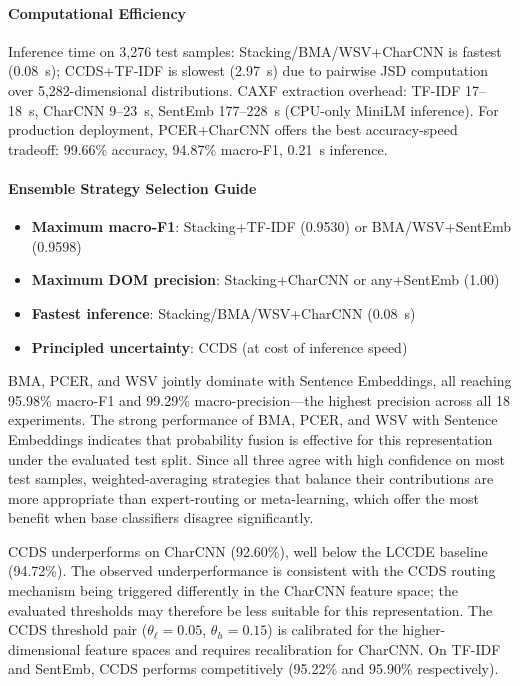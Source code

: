\documentclass[11pt,a4paper]{article}
\begin{document}
\paragraph{Computational Efficiency}
Inference time on 3,276 test samples: Stacking/BMA/WSV+CharCNN is fastest
(0.08~s); CCDS+TF-IDF is slowest (2.97~s) due to pairwise JSD computation
over 5,282-dimensional distributions. CAXF extraction overhead: TF-IDF
17--18~s, CharCNN 9--23~s, SentEmb 177--228~s (CPU-only MiniLM inference).
For production deployment, PCER+CharCNN offers the best accuracy-speed
tradeoff: 99.66\% accuracy, 94.87\% macro-F1, 0.21~s inference.

\paragraph{Ensemble Strategy Selection Guide}
\begin{itemize}
  \item \textbf{Maximum macro-F1}: Stacking+TF-IDF (0.9530) or BMA/WSV+SentEmb (0.9598)
  \item \textbf{Maximum DOM precision}: Stacking+CharCNN or any+SentEmb (1.00)
  \item \textbf{Fastest inference}: Stacking/BMA/WSV+CharCNN (0.08~s)
  \item \textbf{Principled uncertainty}: CCDS (at cost of inference speed)
\end{itemize}

BMA, PCER, and WSV jointly dominate with Sentence Embeddings, all reaching 95.98\% macro-F1 and
99.29\% macro-precision---the highest precision across all 18 experiments. The strong performance of BMA, PCER, and WSV with Sentence Embeddings indicates that probability fusion is effective for this representation under the evaluated test split.
Since all three agree with high confidence on most test samples, weighted-averaging strategies that balance their
contributions are more appropriate than expert-routing or meta-learning, which offer the most
benefit when base classifiers disagree significantly.

CCDS underperforms on CharCNN (92.60\%), well below the LCCDE baseline (94.72\%). The observed underperformance is consistent with the CCDS routing mechanism being triggered differently in the CharCNN feature space; 
the evaluated thresholds may therefore be less suitable for this representation.
The CCDS threshold pair ($\theta_\ell=0.05$, $\theta_h=0.15$) is calibrated for the
higher-dimensional feature spaces and requires recalibration for CharCNN. On TF-IDF and SentEmb,
CCDS performs competitively (95.22\% and 95.90\% respectively).
\end{document}
